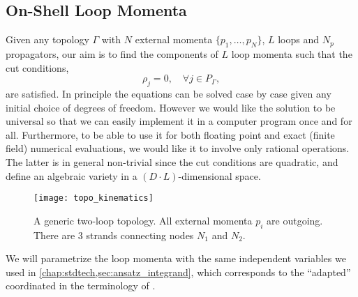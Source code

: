 \subsection{On-Shell Loop Momenta}

Given any topology $\Gamma$ with $N$ external momenta $\{p_1,\ldots{},p_N\}$, $L$ loops and $N_p$ propagators, our aim
is to find the components of $L$ loop momenta such that  
the cut conditions,
\[
  \rho_j = 0, \quad \forall j\in P_\Gamma,
\]
are satisfied. 
In principle the equations can be solved case by case given any initial choice of degrees of freedom.
However we would like the solution to be universal so that we can easily
implement it in a computer program once and for all. 
Furthermore, to be able to use it for both floating point and exact (finite field) numerical evaluations, 
we would like it to involve only rational operations.
The latter is in general non-trivial since the cut conditions are quadratic, and
define an algebraic variety in a $(D\cdot L)$-dimensional space.

\begin{figure}[ht]
  \centering
  \texttt{[image: topo\_kinematics]}
  \caption{A generic two-loop topology. All external momenta $p_i$ are outgoing. There are 3 strands connecting nodes $N_1$ and $N_2$.}
  \label{fig:topo_kinematics}
\end{figure}

We will parametrize the loop momenta 
with the same independent variables we used in \cref{chap:stdtech,sec:ansatz_integrand},
which corresponds to the ``adapted'' coordinated in the terminology of \cite{Ita:2015tya, Abreu:2017xsl}.

